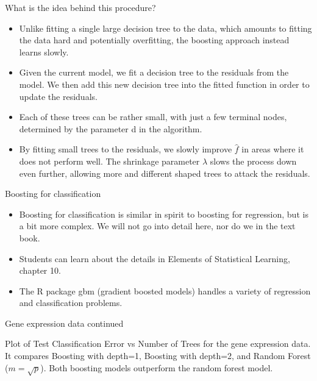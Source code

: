 \documentclass[aspectratio=169, 11pt]{beamer}
\begin{document}
\begin{frame}{What is the idea behind this procedure?}
\begin{itemize}
    \item Unlike fitting a single large decision tree to the data, which amounts to fitting the data hard and potentially overfitting, the boosting approach instead learns slowly.
    \item Given the current model, we fit a decision tree to the residuals from the model. We then add this new decision tree into the fitted function in order to update the residuals.
    \item Each of these trees can be rather small, with just a few terminal nodes, determined by the parameter d in the algorithm.
    \item By fitting small trees to the residuals, we slowly improve $\hat{f}$ in areas where it does not perform well. The shrinkage parameter $\lambda$ slows the process down even further, allowing more and different shaped trees to attack the residuals.
\end{itemize}
\end{frame}

\begin{frame}{Boosting for classification}
\begin{itemize}
    \item Boosting for classification is similar in spirit to boosting for regression, but is a bit more complex. We will not go into detail here, nor do we in the text book.
    \item Students can learn about the details in Elements of Statistical Learning, chapter 10.
    \item The R package gbm (gradient boosted models) handles a variety of regression and classification problems.
\end{itemize}
\end{frame}

\begin{frame}{Gene expression data continued}
\begin{tcolorbox}[colback=LightGray,title=Figure]
Plot of Test Classification Error vs Number of Trees for the gene expression data. It compares Boosting with depth=1, Boosting with depth=2, and Random Forest ($m=\sqrt{p}$). Both boosting models outperform the random forest model.
\end{tcolorbox}
\end{frame}
\end{document}
